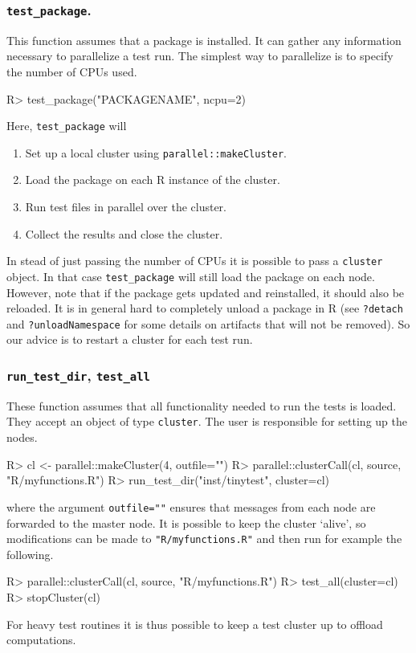 \documentclass[11pt]{article}
\newcommand{\code}[1]{\texttt{#1}}
\begin{document}
\subsubsection*{\code{test\_package}.} 
This function assumes that a package is installed. It can gather any
information necessary to parallelize a test run. The simplest way to
parallelize is to specify the number of CPUs used.
\begin{Schunk}
\begin{Sinput}
R> test_package("PACKAGENAME", ncpu=2)
\end{Sinput}
\end{Schunk}
Here, \code{test\_package} will
\begin{enumerate}
\item Set up a local cluster using \code{parallel::makeCluster}.
\item Load the package on each R instance of the cluster.
\item Run test files in parallel over the cluster.
\item Collect the results and close the cluster.
\end{enumerate}
In stead of just passing the number of CPUs it is possible to pass a
\code{cluster} object. In that case \code{test\_package} will still load the
package on each node. However, note that if the package gets updated and
reinstalled, it should also be reloaded.  It is in general hard to completely
unload a package in R (see \code{?detach} and \code{?unloadNamespace} for some
details on artifacts that will not be removed). So our advice is
to restart a cluster for each test run.


\subsubsection*{\code{run\_test\_dir}, \code{test\_all}}
These function assumes that all functionality needed to run the 
tests is loaded. They accept an object of type \code{cluster}.
The user is responsible for setting up the nodes. 
\begin{Schunk}
\begin{Sinput}
R> cl <- parallel::makeCluster(4, outfile="")
R> parallel::clusterCall(cl, source, "R/myfunctions.R")
R> run_test_dir("inst/tinytest", cluster=cl)
\end{Sinput}
\end{Schunk}
where the argument \code{outfile=""} ensures that messages from each node
are forwarded to the master node.
It is possible to keep the cluster `alive', so modifications
can be made to \code{"R/myfunctions.R"} and then run for
example the following.
\begin{Schunk}
\begin{Sinput}
R> parallel::clusterCall(cl, source, "R/myfunctions.R")
R> test_all(cluster=cl)
R> stopCluster(cl)
\end{Sinput}
\end{Schunk}
For heavy test routines it is thus possible to keep a test cluster
up to offload computations.
\end{document}
